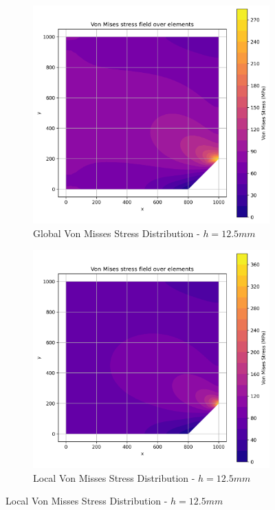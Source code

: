 \begin{figure}[H]
  \centering
  \begin{subfigure}[b]{0.45\textwidth}
    \centering
    \includegraphics[width=\textwidth]{GRAFICOS/Quad4/1.5mm_global/resultados_von_mises.png}
    \caption{Global Von Misses Stress Distribution - $h=12.5mm$}
    \label{fig:img12}
  \end{subfigure}
  \hfill
  \begin{subfigure}[b]{0.45\textwidth}
    \centering
    \includegraphics[width=\textwidth]{GRAFICOS/Quad4/1.5mm_local/resultados_von_mises.png}
    \caption{Local Von Misses Stress Distribution - $h=12.5mm$}
    \label{fig:img22}
  \end{subfigure}
\end{figure}

